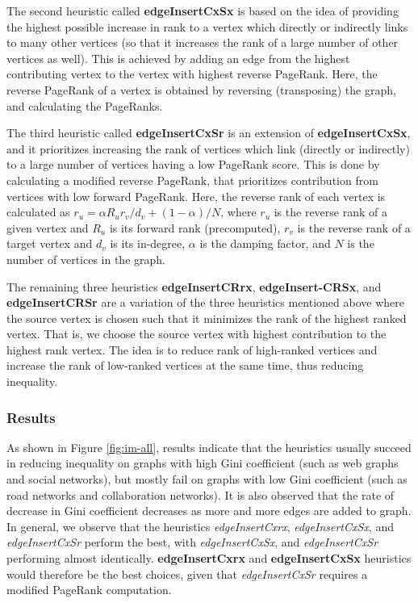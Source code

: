 The second heuristic called \textbf{edgeInsertCxSx} is based on the idea of providing the highest possible increase in rank to a vertex which directly or indirectly links to many other vertices (so that it increases the rank of a large number of other vertices as well). This is achieved by adding an edge from the highest contributing vertex to the vertex with highest reverse PageRank. Here, the reverse PageRank of a vertex is obtained by reversing (transposing) the graph, and calculating the PageRanks.

The third heuristic called \textbf{edgeInsertCxSr} is an extension of \textbf{edgeInsertCxSx}, and it prioritizes increasing the rank of vertices which link (directly or indirectly) to a large number of vertices having a low PageRank score. This is done by calculating a modified reverse PageRank, that prioritizes contribution from vertices with low forward PageRank. Here, the reverse rank of each vertex is calculated as $r_u = \alpha R_u r_v / d_v + (1-\alpha)/N$, where $r_u$ is the reverse rank of a given vertex and $R_u$ is its forward rank (precomputed), $r_v$ is the reverse rank of a target vertex and $d_v$ is its in-degree, $\alpha$ is the damping factor, and $N$ is the number of vertices in the graph.

The remaining three heuristics \textbf{edgeInsertCRrx}, \textbf{edgeInsert-CRSx}, and \textbf{edgeInsertCRSr} are a variation of the three heuristics mentioned above where the source vertex is chosen such that it minimizes the rank of the highest ranked vertex. That is, we choose the source vertex with highest contribution to the highest rank vertex. The idea is to reduce rank of high-ranked vertices and increase the rank of low-ranked vertices at the same time, thus reducing inequality.


\subsubsection{Results}

As shown in Figure \ref{fig:im-all}, results indicate that the heuristics usually succeed in reducing inequality on graphs with high Gini coefficient (such as web graphs and social networks), but mostly fail on graphs with low Gini coefficient (such as road networks and collaboration networks). It is also observed that the rate of decrease in Gini coefficient decreases as more and more edges are added to graph. In general, we observe that the heuristics \textit{edgeInsertCxrx}, \textit{edgeInsertCxSx}, and \textit{edgeInsertCxSr} perform the best, with \textit{edgeInsertCxSx}, and \textit{edgeInsertCxSr} performing almost identically. \textbf{edgeInsertCxrx} and \textbf{edgeInsertCxSx} heuristics would therefore be the best choices, given that \textit{edgeInsertCxSr} requires a modified PageRank computation.

